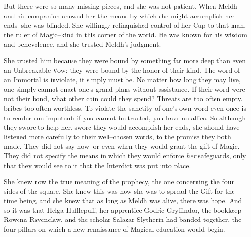 But there were so many missing pieces, and she was not patient. When Meldh and his companion showed her the means by which she might accomplish her ends, she was blinded. She willingly relinquished control of her Cup to that man, the ruler of Magic\mbox{--}kind in this corner of the world. He was known for his wisdom and benevolence, and she trusted Meldh’s judgment.

She trusted him because they were bound by something far more deep than even an Unbreakable Vow: they were bound by the honor of their kind. The word of an Immortal is inviolate, it simply must be. No matter how long they may live, one simply cannot enact one’s grand plans without assistance. If their word were not their bond, what other coin could they spend? Threats are too often empty, bribes too often worthless. To violate the sanctity of one’s own word even once is to render one impotent: if you cannot be trusted, you have no allies.
\SmallVSpace
So although they swore to help her, swore they would accomplish her ends, she should have listened more carefully to their well\mbox{--}chosen words, to the promise they both made. They did not say how, or even when they would grant the gift of Magic. They did not specify the means in which they would enforce \emph{her} safeguards, only that they would see to it that the Interdict was put into place.

She knew now the true meaning of the prophecy, the one concerning the four sides of the square. She knew this was how she was to spread the Gift for the time being, and she knew that as long as Meldh was alive, there was hope.
\SmallVSpace
And so it was that Helga Hufflepuff, her apprentice Godric Gryffindor, the bookkeep Rowena Ravenclaw, and the scholar Salazar Slytherin had banded together, the four pillars on which a new renaissance of Magical education would begin.

